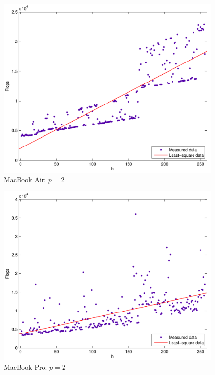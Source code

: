 \documentclass[a4paper,11pt]{article}
\begin{document}
\begin{figure}[H]
\begin{center}
\includegraphics[scale=0.6]{img/mbair-2-put}
\end{center}
\caption{MacBook Air: $p=2$} \label{mbair:2}
\end{figure}

\begin{figure}[H]
\begin{center}
\includegraphics[scale=0.6]{img/mbpro-2-put}
\end{center}
\caption{MacBook Pro: $p=2$} \label{mbpro:2}
\end{figure}
\end{document}
